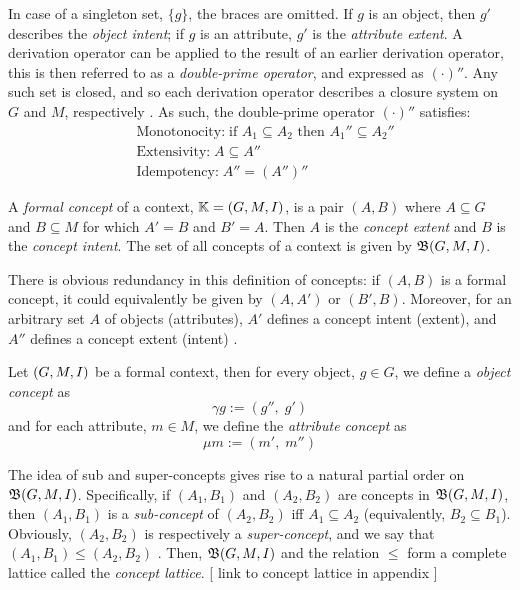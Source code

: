 In case of a singleton set, $\{g\}$, the braces are omitted. If $g$ is an object, then $g'$ describes the \emph{object intent}; if $g$ is an attribute, $g'$ is the \emph{attribute extent}. A derivation operator can be applied to the result of an earlier derivation operator, this is then referred to as a \emph{double-prime operator}, and expressed as $(\cdot)''$. Any such set is closed, and so each derivation operator describes a closure system on $G$ and $M$, respectively \cite{ganter1999formal,ganter2016conceptual,rudolph2007relational}. As such, the double-prime operator $(\cdot)''$ satisfies:
\begin{align}
     & \text{Monotonocity:} \; \text{if } A_1 \subseteq A_2 \text{ then } A_1'' \subseteq A_2'' \\
     & \text{Extensivity:}  \; A \subseteq A''                                                  \\
     & \text{Idempotency:}  \; A'' = (A'')''
\end{align}
%
\begin{definition}
    \label{definition: formal concept}
    A \emph{formal concept} of a context, $\mathbb{K} = (G,M,I)$, is a pair $(A,B)$ where $A\subseteq G$ and $B\subseteq M$ for which $A'=B$ and $B'=A$. Then $A$ is the \emph{concept extent} and $B$ is the \emph{concept intent}.
    The set of all concepts of a context is given by $\mathfrak{B}(G,M,I)$.
\end{definition}
%
There is obvious redundancy in this definition of concepts: if $(A,B)$ is a formal concept, it could equivalently be given by $(A,A')$ or $(B',B)$. Moreover, for an arbitrary set $A$ of objects (attributes), $A'$ defines a concept intent (extent), and $A''$ defines a concept extent (intent) \cite{ganter2016conceptual}.
%
\begin{definition}
    \label{definition: object and attribute concepts}
    Let $(G,M,I)$ be a formal context, then for every object, $g \in G$, we define a \emph{object concept} as
    \[\gamma g := (g'',\; g')\]
    and for each attribute, $m \in M$, we define the \emph{attribute concept} as
    \[\mu m := (m',\; m'')\]
\end{definition}
%
The idea of sub and super-concepts gives rise to a natural partial order on $\mathfrak{B}(G,M,I)$. Specifically, if $(A_1,B_1)$ and $(A_2,B_2)$ are concepts in $\mathfrak{B}(G,M,I)$, then $(A_1,B_1)$ is a \emph{sub-concept} of $(A_2,B_2)$ iff $A_1 \subseteq A_2$ (equivalently, $B_2 \subseteq B_1$). Obviously, $(A_2,B_2)$ is respectively a \emph{super-concept}, and we say that $(A_1,B_1) \leq (A_2,B_2)$ \cite{ganter1999formal}. Then, $\mathfrak{B}(G,M,I)$ and the relation $\leq$ form a complete lattice called the \emph{concept lattice}. [ link to concept lattice in appendix ]

